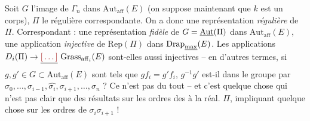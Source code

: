\documentclass[11pt,a4paper]{article}
\begin{document}
Soit $G$ l'image de $\Gamma_n$ dans $\mathrm{Aut}_{\mathrm{aff}}(E)$ (on suppose maintenant que $k$ est un corps), $\Pi$ le   régulière  correspondante. On a donc une représentation \emph{régulière} de $\Pi$. Correspondant : une représentation \emph{fidèle} de $G = \uncertain{\mathrm{Aut}}(\Pi)$ dans $\mathrm{Aut}_{\mathrm{aff}}(E)$, \struck{\ill{}} une application \emph{injective} de $\mathrm{Rep}(\Pi)$ dans $\mathrm{Drap}_{\uncertain{\max}}(E)$. Les applications $D_i(\Pi) \to \struck{\ill{}}\ \mathrm{Grass}_{\mathrm{aff}_i}(E)$ sont-elles aussi injectives -- en d'autres termes, si  $g, g' \in G \subset \mathrm{Aut}_{\mathrm{aff}}(E)$  \add{\ill{}} sont tels que $g f_i = g' f_i$, $g^{-1}g'$ est-il dans le groupe  par $\sigma_0, \dots, \sigma_{i-1}, \widehat{\sigma_i}, \sigma_{i+1}, \dots, \sigma_n$ ? Ce n'est pas  du tout -- et c'est quelque chose qui n'est pas clair que des résultats sur les \struck{\ill{}} ordres des   à la réal.   $\Pi$, impliquant quelque chose sur les ordres de $\sigma_i\sigma_{i+1}$ !
\end{document}
